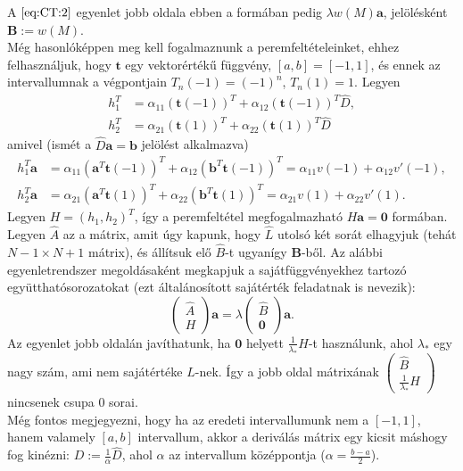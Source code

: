 \documentclass[oneside, titlepage, 12pt, a4paper]{report}
\begin{document}
A $\eqref{eq:CT:2}$ egyenlet jobb oldala ebben a formában pedig $\lambda w(M) \mathbf{a}$, jelölésként $\textbf{B} := w(M)$. \\
Még hasonlóképpen meg kell fogalmaznunk a peremfeltételeinket, ehhez felhasználjuk, hogy $\mathbf{t}$ egy vektorértékű függvény, $[a, b] = [-1, 1]$, és ennek az intervallumnak a végpontjain $T_n(-1) = (-1)^n$, $T_n(1) = 1$. Legyen
\begin{align*}
h_1^T &= \alpha_{11} (\mathbf{t}(-1))^T + \alpha_{12} (\mathbf{t}(-1))^T \hat{D}, \\
h_2^T &= \alpha_{21} (\mathbf{t}(1))^T + \alpha_{22} (\mathbf{t}(1))^T \hat{D}
\end{align*}
amivel (ismét a $\hat{D} \mathbf{a} = \mathbf{b}$ jelölést alkalmazva)
\begin{align*}
h_1^T \mathbf{a} &= \alpha_{11} (\mathbf{a}^T \mathbf{t}(-1))^T + \alpha_{12} (\mathbf{b}^T \mathbf{t}(-1))^T = \alpha_{11} v(-1) + \alpha_{12} v'(-1), \\
h_2^T \mathbf{a} &= \alpha_{21} (\mathbf{a}^T \mathbf{t}(1))^T + \alpha_{22} (\mathbf{b}^T \mathbf{t}(1))^T = \alpha_{21} v(1) + \alpha_{22} v'(1).
\end{align*}
Legyen $H = (h_1, h_2)^T$, így a peremfeltétel megfogalmazható $H \textbf{a} = \textbf{0}$ formában. \\
Legyen $\hat{A}$ az a mátrix, amit úgy kapunk, hogy $\hat{L}$ utolsó két sorát elhagyjuk (tehát $N-1 \times N+1$ mátrix), és állítsuk elő $\hat{B}$-t ugyanígy $\textbf{B}$-ből. Az alábbi egyenletrendszer megoldásaként megkapjuk a sajátfüggvényekhez tartozó együtthatósorozatokat (ezt általánosított sajátérték feladatnak is nevezik):
\begin{equation*}
\begin{pmatrix} \hat{A} \\ H \end{pmatrix} \mathbf{a} = \lambda \begin{pmatrix} \hat{B} \\ \mathbf{0} \end{pmatrix} \mathbf{a}.
\end{equation*}
Az egyenlet jobb oldalán javíthatunk, ha $\mathbf{0}$ helyett $\frac{1}{\lambda_*} H$-t használunk, ahol $\lambda_*$ egy nagy szám, ami nem sajátértéke $L$-nek. Így a jobb oldal mátrixának
$\begin{pmatrix} \hat{B} \\ \frac{1}{\lambda_*} H \end{pmatrix}$
nincsenek csupa $0$ sorai. \\
Még fontos megjegyezni, hogy ha az eredeti intervallumunk nem a $[-1, 1]$, hanem valamely $[a, b]$ intervallum, akkor a deriválás mátrix egy kicsit máshogy fog kinézni: $D := \frac{1}{\alpha} \hat{D}$, ahol $\alpha$ az intervallum középpontja ($\alpha = \frac{b - a}{2}$).
\end{document}
